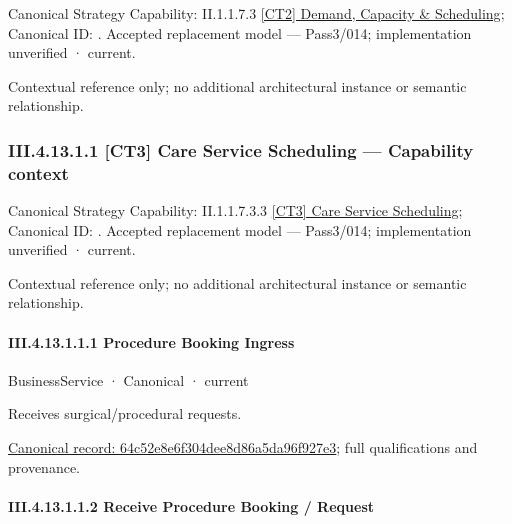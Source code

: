 {\small Canonical Strategy Capability: II.1.1.7.3 \hyperref[element:f94ce7fcb1904141aeae8f2602518126]{[CT2] Demand, Capacity \& Scheduling}; Canonical ID: \texttt{}. Accepted replacement model — Pass3/014; implementation unverified · current.}\par
Contextual reference only; no additional architectural instance or semantic relationship.\par
\subsubsection*{III.4.13.1.1 [CT3] Care Service Scheduling — Capability context}
\label{navigation:III.4.13.1.1}

{\small Canonical Strategy Capability: II.1.1.7.3.3 \hyperref[element:e77883e9c25c43fabdfb7dbeb8fbffe3]{[CT3] Care Service Scheduling}; Canonical ID: \texttt{}. Accepted replacement model — Pass3/014; implementation unverified · current.}\par
Contextual reference only; no additional architectural instance or semantic relationship.\par
\paragraph*{III.4.13.1.1.1 Procedure Booking Ingress}
\label{navigation:III.4.13.1.1.1}

\label{element:64c52e8e6f304dee8d86a5da96f927e3}
{\small BusinessService · Canonical · current}\par

Receives surgical/procedural requests.


{\footnotesize \href{../../../../../../../../continuum/business/business-service/64c52e8e6f304dee8d86a5da96f927e3.md}{Canonical record: 64c52e8e6f304dee8d86a5da96f927e3}; full qualifications and provenance.}\par
\paragraph*{III.4.13.1.1.2 Receive Procedure Booking / Request}
\label{navigation:III.4.13.1.1.2}

